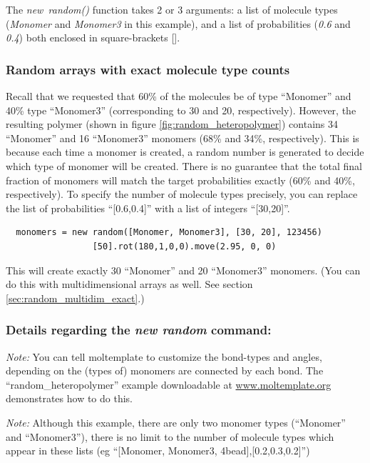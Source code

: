 \documentclass[11pt]{article}
\begin{document}
The \mbox{\textit{new random()}} function takes 2 or 3 arguments:
a list of molecule types 
(\mbox{\textit{Monomer}} and \mbox{\textit{Monomer3}} in this example),
and a list of probabilities (\textit{0.6} and \textit{0.4})
both enclosed in square-brackets [].

\subsubsection{Random arrays with exact molecule type counts}
\label{sec:random_exact}
Recall that we requested that 60\% of the molecules be of type
``Monomer'' and 40\% type ``Monomer3'' (corresponding to 30 and 20, respectively).
However, the resulting polymer (shown in figure \ref{fig:random_heteropolymer})
contains 34 ``Monomer'' and 16 ``Monomer3'' monomers (68\% and 34\%, respectively).
This is because each time a monomer is created, a random number is generated
to decide which type of monomer will be created.
There is no guarantee that the total final fraction of monomers will 
match the target probabilities exactly (60\% and 40\%, respectively).
To specify the number of molecule types precisely, you can replace 
the list of probabilities ``[0.6,0.4]''
with a list of integers ``[30,20]''.
\begin{verbatim}
  monomers = new random([Monomer, Monomer3], [30, 20], 123456)
                 [50].rot(180,1,0,0).move(2.95, 0, 0)
\end{verbatim}
This will create exactly 30 ``Monomer'' and 20 ``Monomer3'' monomers.
(You can do this with multidimensional arrays as well.  
See section \ref{sec:random_multidim_exact}.)


\subsubsection*{Details regarding the \textit{new random} command:}

\textit{Note:} You can tell moltemplate to customize the bond-types and 
              angles, depending on the (types of) monomers are connected
              by each bond.  The ``random\_heteropolymer'' example
              downloadable at \url{www.moltemplate.org} demonstrates
              how to do this.

\textit{Note:}
Although this example, there are only two monomer types
(``Monomer'' and ``Monomer3''), there is no limit to the number 
of molecule types which appear in these lists (eg ``[Monomer, Monomer3, 4bead],[0.2,0.3,0.2]'')
\end{document}
